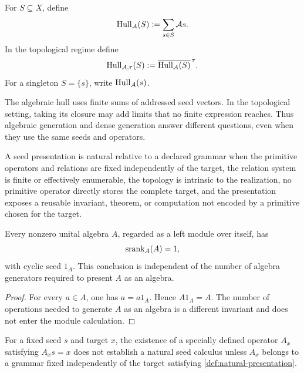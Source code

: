\begin{definition}
\label{def:generated-hull}
For $S\subseteq X$, define
\[
\operatorname{Hull}_{\mathcal A}(S):=\sum_{s\in S}\mathcal A s.
\]
In the topological regime define
\[
\operatorname{Hull}_{\mathcal A,\tau}(S):=\overline{\operatorname{Hull}_{\mathcal A}(S)}^{\,\tau}.
\]
For a singleton $S=\{s\}$, write $\operatorname{Hull}_{\mathcal A}(s)$.
\end{definition}

The algebraic hull uses finite sums of addressed seed vectors.  In the topological setting, taking its closure may add limits that no finite expression reaches.  Thus algebraic generation and dense generation answer different questions, even when they use the same seeds and operators.

\begin{definition}
\label{def:natural-presentation}
A seed presentation is natural relative to a declared grammar when the primitive operators and relations are fixed independently of the target, the relation system is finite or effectively enumerable, the topology is intrinsic to the realization, no primitive operator directly stores the complete target, and the presentation exposes a reusable invariant, theorem, or computation not encoded by a primitive chosen for the target.
\end{definition}

\begin{proposition}
\label{prop:algebra-module-generation}
Every nonzero unital algebra $A$, regarded as a left module over itself, has
\[
\operatorname{srank}_A(A)=1,
\]
with cyclic seed $1_A$.  This conclusion is independent of the number of algebra generators required to present $A$ as an algebra.
\end{proposition}

\begin{proof}
For every $a\in A$, one has $a=a1_A$.  Hence $A1_A=A$.  The number of operations needed to generate $A$ as an algebra is a different invariant and does not enter the module calculation.
\end{proof}

\begin{boundary}
\label{bnd:target-dependent-operators}
For a fixed seed $s$ and target $x$, the existence of a specially defined operator $A_x$ satisfying $A_xs=x$ does not establish a natural seed calculus unless $A_x$ belongs to a grammar fixed independently of the target satisfying \cref{def:natural-presentation}.
\end{boundary}

